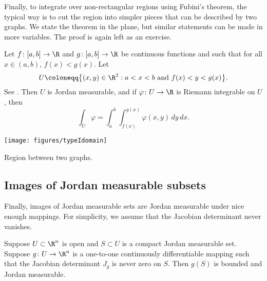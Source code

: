 Finally, to integrate over non-rectangular regions using Fubini's theorem,
the typical way is to cut the region into simpler pieces that can be
described by two graphs.  We state the theorem in the plane, but similar
statements can be made in more variables.  The proof is again left as an
exercise.

\begin{prop} \label{prop:intovertypeIset}
Let $f \colon [a,b] \to \R$ and
$g \colon [a,b] \to \R$ be continuous functions and such that
for all $x \in (a,b)$, $f(x) < g(x)$.  Let
\begin{equation*}
U \coloneqq \bigl\{ (x,y) \in \R^2 : a < x < b \text{ and } f(x) < y < g(x) \bigr\} .
\end{equation*}
See .
Then $U$ is Jordan measurable, and if 
$\varphi \colon U \to \R$ is Riemann integrable on $U$, then
\begin{equation*}
\int_U \varphi =
\int_a^b \int_{f(x)}^{g(x)} \varphi(x,y) \, dy \, dx .
\end{equation*}
\end{prop}

\begin{myfigureht}
\texttt{[image: figures/typeIdomain]}
\caption{Region between two graphs.\label{fig:typeIdomain}}
\end{myfigureht}

\subsection{Images of Jordan measurable subsets}

Finally, images of Jordan measurable sets are Jordan measurable under
nice enough mappings.  For simplicity, we assume that the Jacobian
determinant never vanishes.

\begin{prop} \label{prop:imagejordanmeas}
Suppose $U \subset \R^n$ is open and
$S \subset U$ is a compact Jordan measurable set.
Suppose
$g \colon U \to \R^n$ is a one-to-one
continuously differentiable mapping such that
the Jacobian determinant $J_g$ is never zero on $S$.
Then $g(S)$ is bounded and Jordan measurable.
\end{prop}

